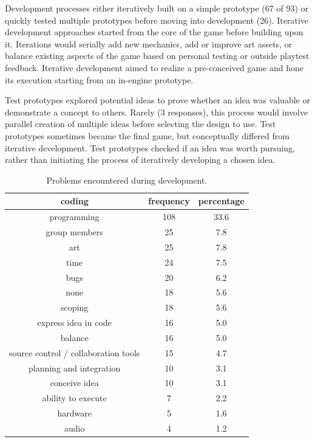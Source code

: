\documentclass{sig-alternate}
\begin{document}
Development processes either iteratively built on a simple prototype (67 of 93) or quickly tested multiple prototypes before moving into development (26).
Iterative development approaches started from the core of the game before building upon it. Iterations would serially add new mechanics, add or improve art assets, or balance existing aspects of the game based on personal testing or outside playtest feedback.
Iterative development aimed to realize a pre-conceived game and hone its execution starting from an in-engine prototype.

Test prototypes explored potential ideas to prove whether an idea was valuable or demonstrate a concept to others. Rarely (3 responses), this process would involve parallel creation of multiple ideas before selecting the design to use. 
Test prototypes sometimes became the final game, but conceptually differed from iterative development. 
Test prototypes checked if an idea was worth pursuing, rather than initiating the process of iteratively developing a chosen idea.


\begin{table}[tb]
\centering
\scriptsize
\begin{tabular}{|c|c|c|}
\hline coding & frequency & percentage \\ 
\hline programming & 108 & 33.6 \\ 
\hline group members & 25 & 7.8 \\ 
\hline art & 25 & 7.8 \\ 
\hline time & 24 & 7.5 \\ 
\hline bugs & 20 & 6.2 \\ 
\hline none & 18 & 5.6 \\ 
\hline scoping & 18 & 5.6 \\ 
\hline express idea in code & 16 & 5.0 \\ 
\hline balance & 16 & 5.0 \\ 
\hline source control / collaboration tools & 15 & 4.7 \\ 
\hline planning and integration & 10 & 3.1 \\ 
\hline conceive idea & 10 & 3.1 \\ 
\hline ability to execute & 7 & 2.2 \\ 
\hline hardware & 5 & 1.6 \\ 
\hline audio & 4 & 1.2 \\
\hline 
\end{tabular}
\caption{Problems encountered during development.}
\label{tab:problem}
\end{table}
\end{document}
